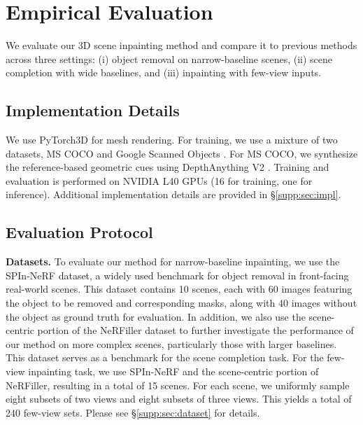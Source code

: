 \section{Empirical Evaluation}
\label{sec:experiments}

We evaluate our 3D scene inpainting method and compare it to previous methods across three settings: (i) 
object removal on narrow-baseline scenes,
(ii) scene completion with wide baselines, and (iii) inpainting with few-view inputs.

\subsection{Implementation Details}
We use PyTorch3D \cite{pytorch3d} for mesh rendering. For training,
we use a mixture of two datasets, MS COCO \cite{coco.dataset} and Google Scanned Objects \cite{gso.dataset}. 
For MS COCO, we synthesize the reference-based geometric cues using DepthAnything V2 \cite{depth.anything.v2}.  
Training and evaluation is performed on NVIDIA L40 GPUs (16 for training, one for inference).
Additional implementation details are provided in \S\ref{supp:sec:impl}.

\subsection{Evaluation Protocol}
\label{subsec:eval-protocol}

\noindent\textbf{Datasets.}
To evaluate our method for narrow-baseline inpainting, we use the SPIn-NeRF \cite{spinnerf} dataset, a widely used benchmark for object removal in front-facing real-world scenes. This dataset
contains
10 scenes, each with 60 images 
featuring
the object to be removed
and corresponding masks,
along with
40 images without the object as ground truth for evaluation.
In addition, we also use the scene-centric portion of the NeRFiller \cite{weber2024nerfiller} dataset to further investigate the performance of our method on more complex scenes,
particularly those with larger baselines.
This dataset serves as a benchmark for the scene completion task. 
For the few-view inpainting task, we use SPIn-NeRF and the scene-centric portion of NeRFiller, resulting in a total of 15 scenes. For each scene, we uniformly sample eight subsets of two views and eight subsets of three views. This yields a total of 240 few-view sets. Please see \S\ref{supp:sec:dataset} for details.

